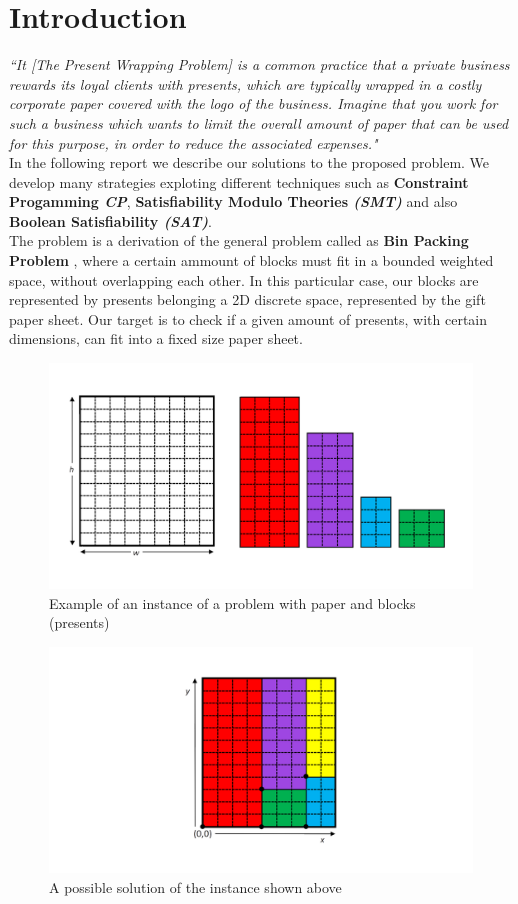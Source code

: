 \chapter{Introduction}
\textit{
    ``It [The Present Wrapping Problem] is a common practice that a private business rewards its loyal clients with presents, which are typically wrapped in a costly
    corporate paper covered with the logo of the business. Imagine that you work for such a business which wants to limit the overall amount of paper that can be used for this purpose,
    in order to reduce the associated expenses." \cite{project}
}
\\

In the following report we describe our solutions to the proposed problem.
We develop many strategies exploting different techniques such as \textbf{Constraint Progamming \textit{CP}},
\textbf{Satisfiability Modulo Theories \textit{(SMT)}} and also \textbf{Boolean Satisfiability \textit{(SAT)}}.
\\
The problem is a derivation of the general problem called as \textbf{Bin Packing Problem} \cite{binpack}, where a certain ammount of blocks must fit
in a bounded weighted space, without overlapping each other.
In this particular case, our blocks are represented by presents belonging a 2D discrete space, represented by the gift paper sheet.
Our target is to check if a given amount of presents, with certain dimensions, can fit into a fixed size paper sheet. 

\begin{figure}
	\centering
	\includegraphics[width=\textwidth]{images/input_problem.png}
	\caption{Example of an instance of a problem with paper and blocks (presents)}
	\label{fig:overlaps}
\end{figure}

\begin{figure}
	\centering
	\includegraphics[width=\textwidth]{images/solved_problem.png}
	\caption{A possible solution of the instance shown above}
	\label{fig:overlaps}
\end{figure}